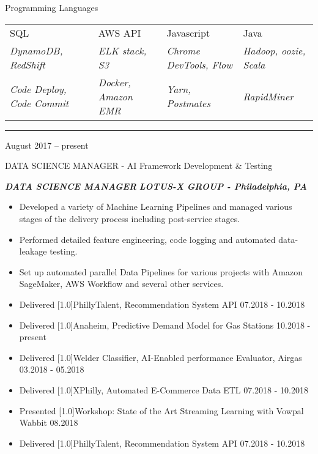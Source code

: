 \documentclass[a4paper,10pt]{article}
\newlength{\cvcolumngapwidth}
\newlength{\cvleftcolumnwidth}
\newlength{\cvrightcolumnwidth}
\newcommand{\cvsectionstyle}[1]{{\normalsize\cvsectionfont\textcolor{cvsectioncolor}{#1}}}
\newcommand{\cvtitlestyle}[1]{{\large\cvtitlefont\textcolor{cvtitlecolor}{#1}}}
\newcommand{\cvdurationstyle}[1]{{\small\cvdurationfont\textcolor{cvdurationcolor}{#1}}}
\newcommand{\cvheadingstyle}[1]{{\normalsize\cvheadingfont\textcolor{cvheadingcolor}{#1}}}
\newcommand{\cvboldstlye}[1]{{\normalsize\cvboldfont\textcolor{cvboldcolor}{\scalebox{.93}[1.0]{#1}}}}
\newlength{\cvafteritemskipamount}
\newlength{\cvaftersectionskipamount}
\newlength{\cvaftertitleskipamount}
\newlength{\cvparskip}
\newcommand{\cvsection}[1]{
    \begin{minipage}[t]{\cvleftcolumnwidth}
        \raggedleft\cvsectionstyle{#1}
    \end{minipage}%
    \hspace{\cvcolumngapwidth}%
    \begin{minipage}[t]{\cvrightcolumnwidth}
        \textcolor{cvrulecolor}{\rule{\cvrightcolumnwidth}{0.3mm}}
    \end{minipage}

    \vspace{\cvaftersectionskipamount}
}
\newcommand{\cvitem}[2]{
    \begin{minipage}[t]{\cvleftcolumnwidth}
        \raggedleft #1
    \end{minipage}%
    \hspace{\cvcolumngapwidth}%
    \begin{minipage}[t]{\cvrightcolumnwidth}
        \setlength{\parskip}{\cvparskip} #2
    \end{minipage}

    \vspace{\cvafteritemskipamount}
}
\newcommand{\cvtitle}[1]{
    \cvtitlestyle{#1}

    \vspace{\cvaftertitleskipamount}
    \vspace{-\cvparskip}
}
\begin{document}
\vspace{-2mm}
\cvitem{
    \cvheadingstyle{Programming Languages}

}{
        \setlength\tabcolsep{5pt}
        \begin{tabular}{|l|l|l|l|}
        SQL  & AWS API & Javascript & Java \\
         \footnotesize{\emph{DynamoDB, RedShift}} &
         \footnotesize{\emph{ELK stack, S3}} &
         \footnotesize{\emph{Chrome DevTools, Flow}} &
         \footnotesize{\emph{Hadoop, oozie, Scala }}\\

         \footnotesize{\emph{Code Deploy, Code Commit }} &
         \footnotesize{\emph{Docker, Amazon EMR }} &
         \footnotesize{\emph{Yarn, Postmates}} &
         \footnotesize{\emph{RapidMiner}}\\



        \end{tabular}
 }






\cvsection{\textbf{WORK EXPERIENCE}}

\cvitem{
    \cvdurationstyle{August 2017 -- present}
}{
    \cvtitle{DATA SCIENCE MANAGER - AI Framework Development \& Testing}

    \textcolor{cvwhatcolor}{\emph{\textbf{DATA SCIENCE MANAGER}}}
    \textcolor{cvwherecolor}{\textbf{\textbar}}
    \textcolor{cvwherecolor}{\emph{\textbf{LOTUS-X GROUP - Philadelphia, PA}}}

    \begin{itemize}[leftmargin=*]
        \item Developed a variety of Machine Learning Pipelines and managed various stages of the delivery process including post-service stages.
        \item Performed detailed feature engineering, code logging and automated data-leakage testing.
        \item Set up automated parallel Data Pipelines for various projects with Amazon SageMaker, AWS Workﬂow and several other services.
        \item Delivered {\cvboldstlye{PhillyTalent, Recommendation System API} 07.2018 - 10.2018}
        \item Delivered {\cvboldstlye{Anaheim, Predictive Demand Model for Gas Stations} 10.2018 - present}
        \item Delivered {\cvboldstlye{Welder Classiﬁer, AI-Enabled performance Evaluator, Airgas} 03.2018 - 05.2018}
        \item Delivered {\cvboldstlye{XPhilly, Automated E-Commerce Data ETL} 07.2018 - 10.2018}
        \item Presented {\cvboldstlye{Workshop: State of the Art Streaming Learning with Vowpal Wabbit} 08.2018}
        \item Delivered {\cvboldstlye{PhillyTalent, Recommendation System API} 07.2018 - 10.2018}

    \end{itemize}
}
\end{document}

